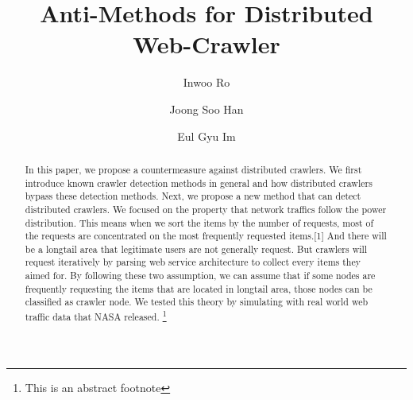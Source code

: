 \documentclass[sigconf,anonymous=false]{acmart}
\begin{document}
\title{Anti-Methods for Distributed Web-Crawler}

\author{Inwoo Ro}

\author{Joong Soo Han}

\author{Eul Gyu Im}



\begin{abstract}
In this paper, we propose a countermeasure against distributed crawlers. We first introduce known crawler detection methods in general and how distributed crawlers bypass these detection methods. Next, we propose a new method that can detect distributed crawlers. We focused on the property that network traffics follow the power distribution. This means when we sort the items by the number of requests, most of the requests are concentrated on the most frequently requested items.[1] And there will be a longtail area that legitimate users are not generally request. But crawlers will request iteratively by parsing web service architecture to collect every items they aimed for. By following these two assumption, we can assume that if some nodes are frequently requesting the items that are located in longtail area, those nodes can be classified as crawler node. We tested this theory by simulating with real world web traffic data that NASA released. \footnote{This is an abstract footnote}
\end{abstract}



\maketitle
\end{document}
